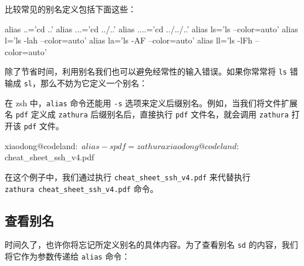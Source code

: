 \documentclass[]{ctexbook}
\newenvironment{Shaded}{\begin{snugshade}}{\end{snugshade}}
\newcommand{\BuiltInTok}[1]{#1}
\newcommand{\ExtensionTok}[1]{#1}
\newcommand{\NormalTok}[1]{#1}
\newcommand{\StringTok}[1]{\textcolor[rgb]{0.31,0.60,0.02}{#1}}
\begin{document}
比较常见的别名定义包括下面这些：

\begin{Shaded}
\begin{Highlighting}[]
\BuiltInTok{alias}\NormalTok{ ..=}\StringTok{'cd ..'}
\BuiltInTok{alias}\NormalTok{ ...=}\StringTok{'cd ../..'}
\BuiltInTok{alias}\NormalTok{ ....=}\StringTok{'cd ../../..'}
\BuiltInTok{alias}\NormalTok{ ls=}\StringTok{'ls --color=auto'}
\BuiltInTok{alias}\NormalTok{ l=}\StringTok{'ls -lah --color=auto'}
\BuiltInTok{alias}\NormalTok{ la=}\StringTok{'ls -AF --color=auto'}
\BuiltInTok{alias}\NormalTok{ ll=}\StringTok{'ls -lFh --color=auto'}
\end{Highlighting}
\end{Shaded}

除了节省时间，利用别名我们也可以避免经常性的输入错误。如果你常常将 \texttt{ls} 错输成 \texttt{sl}，那么不妨为它定义一个别名：

\begin{Shaded}
\end{Shaded}

在 zsh 中，\texttt{alias} 命令还能用 \texttt{-s} 选项来定义后缀别名。例如，当我们将文件扩展名 \texttt{pdf} 定义成 \texttt{zathura} 后缀别名后，直接执行 \texttt{pdf} 文件名，就会调用 \texttt{zathura} 打开该 \texttt{pdf} 文件。

\begin{Shaded}
\begin{Highlighting}[]
\ExtensionTok{xiaodong@codeland}\NormalTok{:~$ alias -s pdf=zathura}
\ExtensionTok{xiaodong@codeland}\NormalTok{:~$ cheat_sheet_ssh_v4.pdf}
\end{Highlighting}
\end{Shaded}

在这个例子中，我们通过执行 \texttt{cheat\_sheet\_ssh\_v4.pdf} 来代替执行 \texttt{zathura\ cheat\_sheet\_ssh\_v4.pdf} 命令。

\hypertarget{ux67e5ux770bux522bux540d}{%
\subsection{查看别名}\label{ux67e5ux770bux522bux540d}}

时间久了，也许你将忘记所定义别名的具体内容。为了查看别名 \texttt{sd} 的内容，我们将它作为参数传递给 \texttt{alias} 命令：
\end{document}
